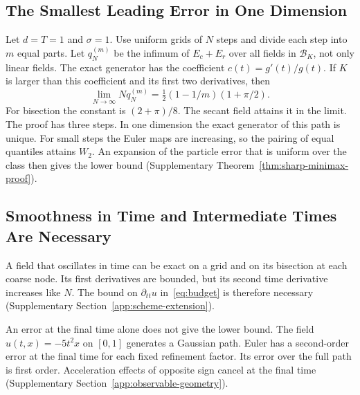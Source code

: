 \subsection{The Smallest Leading Error in One Dimension}
Let $d=T=1$ and $\sigma=1$. Use uniform grids of $N$ steps and
divide each step into $m$ equal parts. Let $q_N^{(m)}$ be the infimum
of $E_c+E_r$ over all fields in $\mathcal B_K$, not only linear
fields. The
exact generator has the coefficient $c(t)=g'(t)/g(t)$. If $K$ is larger
than this coefficient and its first two derivatives, then
\begin{equation}\label{eq:sharp-main}
 \lim_{N\to\infty}Nq_N^{(m)}=\tfrac12(1-1/m)(1+\pi/2).
\end{equation}
For bisection the constant is $(2+\pi)/8$. The secant field attains it in the limit.
The proof has three steps. In one dimension the exact generator of this
path is unique. For small steps the Euler maps are increasing, so the
pairing of equal quantiles attains $W_2$. An expansion of the particle
error that is uniform over the class then gives the lower bound
(Supplementary Theorem~\ref{thm:sharp-minimax-proof}).

\subsection{Smoothness in Time and Intermediate Times Are Necessary}
A field that oscillates in time can be exact on a grid and on its
bisection at each coarse node. Its first derivatives are bounded, but
its second time derivative increases like $N$. The bound on
$\partial_{tt}u$ in~\eqref{eq:budget} is therefore necessary
(Supplementary Section~\ref{app:scheme-extension}).

An error at the final time alone does not give the lower bound. The
field $u(t,x)=-5t^2x$ on $[0,1]$ generates a Gaussian path. Euler has a
second-order error at the final time for each fixed refinement factor.
Its error over the full path is first order. Acceleration effects of
opposite sign cancel at the final time (Supplementary
Section~\ref{app:observable-geometry}).



